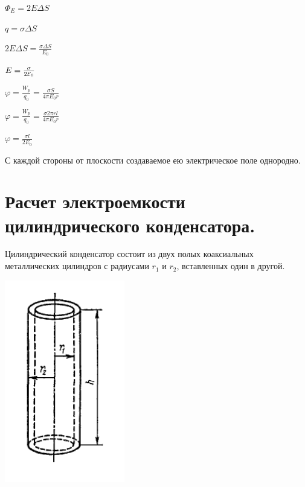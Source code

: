 \documentclass[12pt]{report}
\begin{document}
\begin{center}
    $\Phi_E = 2 E \Delta S$
\end{center}
\begin{center}
    $q = \sigma \Delta S$
\end{center}
\begin{center}
    $2 E \Delta S = \frac{\sigma \Delta S}{E_0} $
\end{center}
\begin{center}
    $E = \frac{\sigma}{2 \varE_0} $
\end{center}
\begin{center}
    $\varphi = \frac{W_p}{q_0} = \frac{\sigma S}{4 \pi E_0 r}$
\end{center}
\begin{center}
    $\varphi = \frac{W_p}{q_0} = \frac{\sigma 2 \pi r l}{4 \pi E_0 r}$
\end{center}
\begin{center}
    $\varphi = \frac{\sigma l}{2 E_0}$
\end{center}
\par С каждой стороны от плоскости создаваемое ею электрическое поле однородно.

\setcounter{section}{14}
\section{Расчет электроемкости цилиндрического конденсатора.}

Цилиндрический конденсатор состоит из двух полых коаксиальных металлических цилиндров с радиусами $r_1$ и $r_2$, вставленных один в другой.

\begin{center}
    \includegraphics{graphics/t15.PNG}
\end{center}
\end{document}
